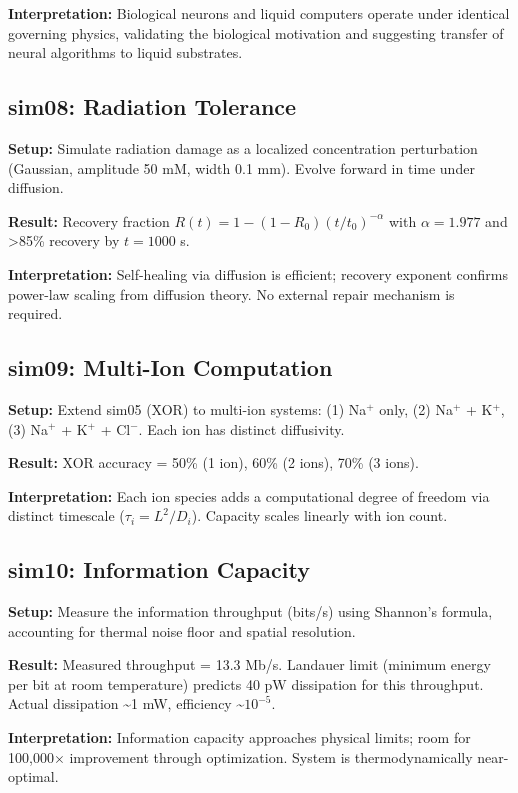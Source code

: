 \documentclass[11pt]{article}
\begin{document}
\textbf{Interpretation:} Biological neurons and liquid computers operate under identical governing physics, validating the biological motivation and suggesting transfer of neural algorithms to liquid substrates.

\subsection{sim08: Radiation Tolerance}

\textbf{Setup:} Simulate radiation damage as a localized concentration perturbation (Gaussian, amplitude 50 mM, width 0.1 mm). Evolve forward in time under diffusion.

\textbf{Result:} Recovery fraction $R(t) = 1 - (1 - R_0)(t / t_0)^{-\alpha}$ with $\alpha = 1.977$ and >85\% recovery by $t = 1000$ s.

\textbf{Interpretation:} Self-healing via diffusion is efficient; recovery exponent confirms power-law scaling from diffusion theory. No external repair mechanism is required.

\subsection{sim09: Multi-Ion Computation}

\textbf{Setup:} Extend sim05 (XOR) to multi-ion systems: (1) Na$^+$ only, (2) Na$^+$ + K$^+$, (3) Na$^+$ + K$^+$ + Cl$^-$. Each ion has distinct diffusivity.

\textbf{Result:} XOR accuracy = 50\% (1 ion), 60\% (2 ions), 70\% (3 ions).

\textbf{Interpretation:} Each ion species adds a computational degree of freedom via distinct timescale ($\tau_i = L^2 / D_i$). Capacity scales linearly with ion count.

\subsection{sim10: Information Capacity}

\textbf{Setup:} Measure the information throughput (bits/s) using Shannon's formula, accounting for thermal noise floor and spatial resolution.

\textbf{Result:} Measured throughput = 13.3 Mb/s. Landauer limit (minimum energy per bit at room temperature) predicts 40 pW dissipation for this throughput. Actual dissipation \textasciitilde 1 mW, efficiency \textasciitilde $10^{-5}$.

\textbf{Interpretation:} Information capacity approaches physical limits; room for 100,000$\times$ improvement through optimization. System is thermodynamically near-optimal.
\end{document}
